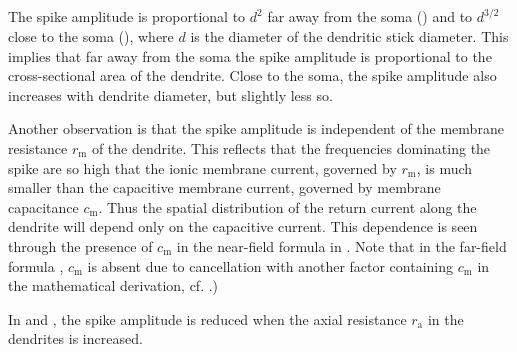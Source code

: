 \subsection{}
The spike amplitude is proportional to $d^{2}$ far away from the soma  () 
and to $d^{3/2}$ close to the soma (),
where $d$ is the diameter of the dendritic stick diameter. 
This implies that far away from the soma the spike amplitude is proportional to 
the cross-sectional area of the dendrite. 
Close to the soma, the spike amplitude also increases with dendrite diameter, but slightly less so.

Another observation is that the spike amplitude is independent of the membrane resistance $r_\mathrm{m}$ of the dendrite. This reflects that the frequencies dominating the spike are so high that the ionic membrane current, 
governed by $r_\mathrm{m}$, is much smaller than the capacitive membrane current, 
governed by membrane capacitance $c_\mathrm{m}$.  
Thus the spatial distribution of the return current along the dendrite will depend only on the capacitive current. 
This dependence is seen through the presence of  $c_\mathrm{m}$ in the near-field formula in . 
Note that in the far-field formula ,  
$c_\mathrm{m}$ is absent due to cancellation with another factor containing $c_\mathrm{m}$ in the mathematical derivation, 
cf. .)

In  and , the spike amplitude is reduced when the 
axial resistance $r_\mathrm{a}$ in the dendrites is increased. 

